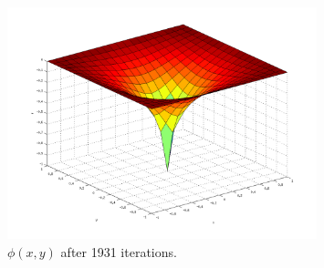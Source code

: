 \begin{figure}[h!]
	\centering
	\includegraphics[width=0.8\textwidth]{img/exc1_laplace}
	\caption{$\phi(x,y)$ after 1931 iterations.}
	\label{fig:exc1_laplace}
\end{figure}


